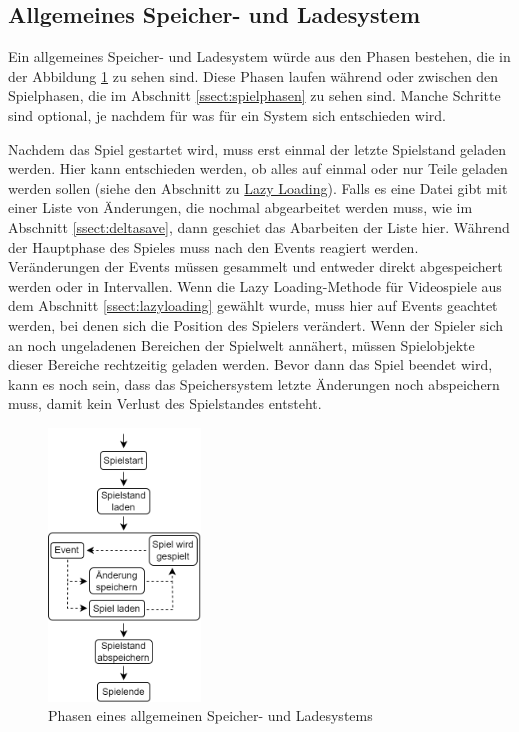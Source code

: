 \subsection{Allgemeines Speicher- und Ladesystem}
Ein allgemeines Speicher- und Ladesystem würde aus den Phasen bestehen, die in der Abbildung \ref{fig:speicherphasen} zu sehen sind. Diese Phasen laufen während oder zwischen den Spielphasen, die im Abschnitt \ref{ssect:spielphasen} zu sehen sind. Manche Schritte sind optional, je nachdem für was für ein System sich entschieden wird.

Nachdem das Spiel gestartet wird, muss erst einmal der letzte Spielstand geladen werden. Hier kann entschieden werden, ob alles auf einmal oder nur Teile geladen werden sollen (siehe den Abschnitt zu \hyperref[ssect:lazyloading]{Lazy Loading}). Falls es eine Datei gibt mit einer Liste von Änderungen, die nochmal abgearbeitet werden muss, wie im Abschnitt \ref{ssect:deltasave}, dann geschiet das Abarbeiten der Liste hier. Während der Hauptphase des Spieles muss nach den Events reagiert werden. Veränderungen der Events müssen gesammelt und entweder direkt abgespeichert werden oder in Intervallen. Wenn die Lazy Loading-Methode für Videospiele aus dem Abschnitt \ref{ssect:lazyloading} gewählt wurde, muss hier auf Events geachtet werden, bei denen sich die Position des Spielers verändert. Wenn der Spieler sich an noch ungeladenen Bereichen der Spielwelt annähert, müssen Spielobjekte dieser Bereiche rechtzeitig geladen werden. Bevor dann das Spiel beendet wird, kann es noch sein, dass das Speichersystem letzte Änderungen noch abspeichern muss, damit kein Verlust des Spielstandes entsteht.

\begin{figure}[htp]
    \centering
    \includegraphics[width=0.36\textwidth]{images/Speichersystem.png}
    \caption{Phasen eines allgemeinen Speicher- und Ladesystems}
    \label{fig:speicherphasen}
\end{figure}

